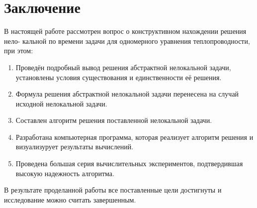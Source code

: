 \documentclass{article}
\theoremstyle{definition}
\begin{document}
\section*{Заключение}
В настоящей работе рассмотрен вопрос о конструктивном нахождении решения нело-
кальной по времени задачи для одномерного уравнения теплопроводности, при этом:
\begin{enumerate}
	\item Проведён подробный вывод решения абстрактной нелокальной задачи, установлены условия существования и единственности её решения.
	
	\item Формула решения абстрактной нелокальной задачи перенесена на случай исходной нелокальной задачи.
	
	\item Составлен алгоритм решения поставленной нелокальной задачи.
	
	\item Разработана компьютерная программа, которая реализует алгоритм решения и визуализурует результаты вычислений.
	
	\item Проведена большая серия вычислительных экспериментов, подтвердившая высокую надежность алгоритма.
\end{enumerate}
В результате проделанной работы все поставленные цели достигнуты и исследование
можно считать завершенным.
\newpage
\end{document}
